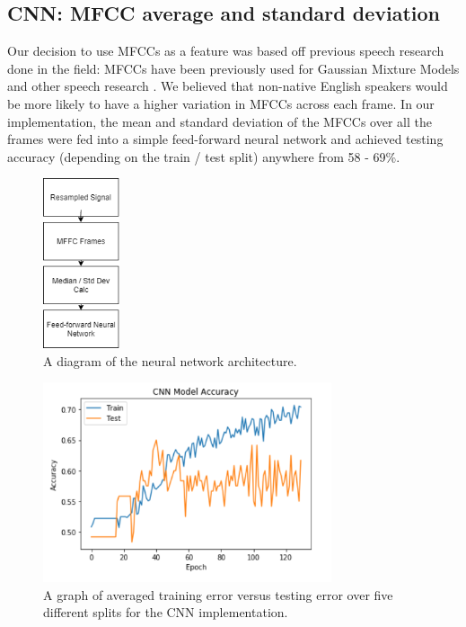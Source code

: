 \documentclass{article}
\begin{document}
\subsection{CNN: MFCC average and standard deviation}
\label{subsec:cnn}

Our decision to use MFCCs as a feature was based off previous speech research done in the field: MFCCs have been previously used for Gaussian Mixture Models and other speech research \cite{mfccs, chuaccent}.
We believed that non-native English speakers would be more likely to have a higher variation in MFCCs across each frame.
In our implementation, the mean and standard deviation of the MFCCs over all the frames were fed into a simple feed-forward neural network and achieved testing accuracy (depending on the train / test split) anywhere from 58 - 69\%.

\begin{figure}[htb]
	\centering
	\includegraphics[width = 2.25cm]{figs/cnn_architecture}
	\caption{A diagram of the neural network architecture.}
	\label{fig:cnn_architecture}
\end{figure}

\begin{figure}[htb]
	\centering
	\includegraphics[width = 8.5cm]{figs/cnn_graph}
	\caption{A graph of averaged training error versus testing error over five different splits for the CNN implementation.}
	\label{fig:cnn_graph}
\end{figure}
\end{document}
